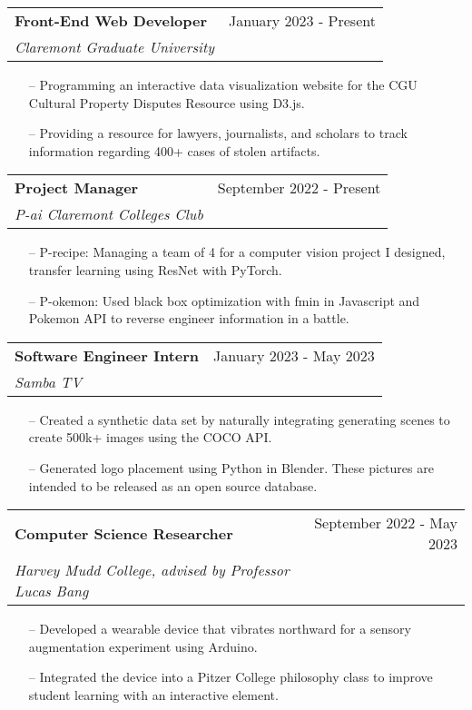 \documentclass[letterpaper,10pt]{article}
\makeatletter
\newcommand{\resumeSubheading}[4]{
  \vspace{-2pt}\item
    \begin{tabular*}{0.97\textwidth}[t]{l@{\extracolsep{\fill}}r}
      \textbf{#1} & #2 \\
      \textit{\small#3} & \textit{\small #4} \\
    \end{tabular*}\vspace{-7pt}
}
\makeatother
\begin{document}
    \resumeSubheading
      {Front-End Web Developer}{January 2023 - Present}
      {Claremont Graduate University}{}
      \begin{itemize}\small
      \setlength\itemsep{0em}
        \item[--] Programming an interactive data visualization website for the CGU Cultural Property Disputes Resource using D3.js.
        \item[--] Providing a resource for lawyers, journalists, and scholars to track information regarding 400+ cases of stolen artifacts.

      \end{itemize}

    \resumeSubheading
      {Project Manager}{September 2022 - Present}
      {P-ai Claremont Colleges Club}{}
      \begin{itemize}\small
      \setlength\itemsep{0em}
        \item[--] P-recipe: Managing a team of 4 for a computer vision project I designed, transfer learning using ResNet with PyTorch.
        \item[--] P-okemon: Used black box optimization with fmin in Javascript and Pokemon API to reverse engineer information in a battle.

      \end{itemize}

    \resumeSubheading
      {Software Engineer Intern}{January 2023 - May 2023}
      {Samba TV}{}
      \begin{itemize}\small
      \setlength\itemsep{0em}
        \item[--] Created a synthetic data set by naturally integrating generating scenes to create 500k+ images using the COCO API.
        \item[--] Generated logo placement using Python in Blender. These pictures are intended to be released as an open source database.

      \end{itemize}
    \resumeSubheading
      {Computer Science Researcher}{September 2022 - May 2023}
      {Harvey Mudd College, advised by Professor Lucas Bang}{}
      \begin{itemize}\small
      \setlength\itemsep{0em}
        \item[--] Developed a wearable device that vibrates northward for a sensory augmentation experiment using Arduino.
        \item[--] Integrated the device into a Pitzer College philosophy class to improve student learning with an interactive element.

      \end{itemize}
      
\end{document}
